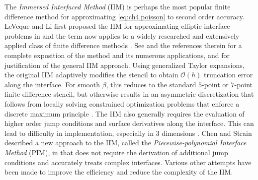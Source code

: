 The \emph{Immersed Interfaced Method} (IIM) is perhaps the most popular finite difference method for approximating \eqref{eq:ch4.poisson} to second order accuracy. LeVeque and Li first proposed the IIM for approximating elliptic interface problems in \cite{Leveque94} and the term now applies to a widely researched and extensively applied class of finite difference methods \cite{Leveque97, Li.Zhilin_Lai.Ming-Chih01, Lee.Long03, Le.D.V06, Xu.Sheng06, Tan.Zhijun08, Xu.Sheng08}. See \cite{Li.Zhilin06} and the references therein for a complete exposition of the method and its numerous applications, and \cite{Beale06} for justification of the general IIM approach. Using generalized Taylor expansions, the original IIM adaptively modifies the stencil to obtain $\mathcal{O}(h)$ truncation error along the interface. For smooth $\beta$, this reduces to the standard $5$-point or $7$-point finite difference stencil, but otherwise results in an asymmetric discretization that follows from locally solving constrained optimization problems that enforce a discrete maximum principle \cite{Li.Zhilin_Ito.Kazufumi01}. The IIM also generally requires the evaluation of higher order jump conditions and surface derivatives along the interface. This can lead to difficulty in implementation, especially in $3$ dimensions \cite{Deng03, Li.Zhilin06, Xu.Sheng06, Xu.Sheng08}. Chen and Strain described a new approach to the IIM, called the \emph{Piecewise-polynomial Interface Method} (PIM), in \cite{Chen.Tianbing08} that does not require the derivation of additional jump conditions and accurately treats complex interfaces. Various other attempts have been made \cite{Li.Zhilin98.02, Weigmann00, Berthelsen04, Adams.Loyce02, Adams.Loyce04, Adams.Loyce05, Li.Zhilin06} to improve the efficiency and reduce the complexity of the IIM.

